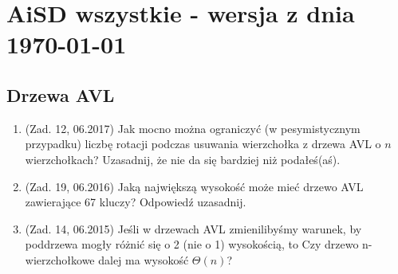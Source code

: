 \documentclass[10pt]{article}%
\begin{document}
\section*{AiSD wszystkie - wersja z dnia \today}




\subsection*{Drzewa AVL}
\begin{enumerate}
\item (Zad. 12, 06.2017) Jak mocno można ograniczyć (w pesymistycznym przypadku) liczbę rotacji podczas usuwania wierzchołka z drzewa AVL o $n$ wierzchołkach? Uzasadnij, że nie da się bardziej niż podałeś(aś).

\item (Zad. 19, 06.2016) Jaką największą wysokość może mieć drzewo AVL zawierające 67 kluczy? Odpowiedź uzasadnij.

\item (Zad. 14, 06.2015) Jeśli w drzewach AVL zmienilibyśmy warunek, by poddrzewa mogły różnić się o 2 (nie o 1) wysokością, to Czy drzewo n-wierzchołkowe dalej ma wysokość $\Theta(n)$? 

\end{enumerate}
\end{document}

